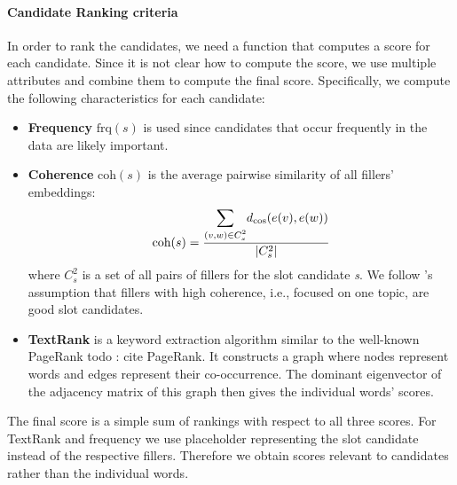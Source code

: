 \paragraph{Candidate Ranking criteria}
In order to rank the candidates, we need a function that computes a score for each candidate.
Since it is not clear how to compute the score, we use multiple attributes and combine them to compute the final score.
Specifically, we compute the following characteristics for each candidate:
\begin{itemize}[nosep,leftmargin=10pt]
    \item \textbf{Frequency} $\text{frq}(s)$ is used since candidates that occur frequently in the data are likely important.
    
    \item \textbf{Coherence} $\text{coh}(s)$ is the average pairwise similarity of all fillers' embeddings:
    \begin{equation}
        \text{coh}(s) = \frac{\mathlarger{\sum}_{(v,w) \in C^2_s}{d_{\cos}(e(v), e(w))}}{|C^2_s|}
    \end{equation}
    where $C^2_s$ is a set of all pairs of fillers for the slot candidate \emph{s}.
    We follow \citet{chen2014leveraging}'s assumption that fillers with high coherence, i.e., focused on one topic, are good slot candidates.
    
    \item \textbf{TextRank} \cite{mihalcea2004textrank} is a keyword extraction algorithm similar to the well-known PageRank todo : cite PageRank.
    It constructs a graph where nodes represent words and edges represent their co-occurrence.
    The dominant eigenvector of the adjacency matrix of this graph then gives the individual words' scores.
\end{itemize}
The final score is a simple sum of rankings with respect to all three scores.
For TextRank and frequency we use placeholder representing the slot candidate instead of the respective fillers.
Therefore we obtain scores relevant to candidates rather than the individual words.

